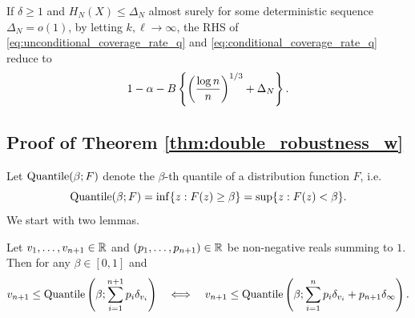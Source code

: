 

  \begin{remark}
    If $\delta \ge 1$ and $H_{N}(X)\le \Delta_{N}$ almost surely for some deterministic sequence $\Delta_{N} = o(1)$, by letting $k, \ell\rightarrow \infty$, the RHS of \eqref{eq:unconditional_coverage_rate_q} and \eqref{eq:conditional_coverage_rate_q} reduce to
    \[1 - \alpha - B \left\{\left(\frac{\log n}{n}\right)^{1/3} + \Delta_{N}\right\}.\]
  \end{remark}


\subsection{Proof of Theorem \ref{thm:double_robustness_w}}
Let $\mathrm{Quantile}(\beta; F)$ denote the $\beta$-th quantile of a distribution
function $F$, i.e.
\[
\mathrm{Quantile}(\beta; F) = \inf\{z: F(z)\ge \beta\} = \sup\{z: F(z) < \beta\}.
\]
We start with two lemmas. 
\begin{lemma}\label{lem:delta_infty}
  Let $v_{1}, \ldots, v_{n+1} \in \mathbb{R}$ and $(p_{1}, \ldots,
  p_{n+1}) \in \mathbb{R}$ be non-negative reals summing to
  $1$. Then for any $\beta \in [0, 1]$ and
  \begin{multline*}
    v_{n+1}\le \mathrm{Quantile}\left(\beta; \sum_{i=1}^{n+1}p_{i}\delta_{v_{i}}\right)
    \quad \Longleftrightarrow \quad v_{n+1}\le \mathrm{Quantile}\left( \beta; \sum_{i=1}^{n}p_{i}\delta_{v_{i}} + p_{n+1}\delta_{\infty}\right).
  \end{multline*}
\end{lemma}

